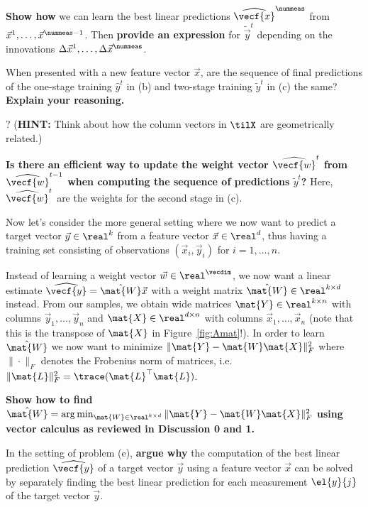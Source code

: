 \documentclass[preview]{standalone}
\begin{document}
\begin{Parts}
{\bf Show how} we can learn the best linear predictions
$\widehat{\vecf{x}}^\nummeas$ from
$\vec{x}^1,\dots, \vec{x}^{\nummeas-1}$. Then {\bf provide an
  expression} for $\tilde{\vec{y}}^t$ depending on the innovations
$\Delta\vec{x}^1,\dots, \Delta\vec{x}^{\nummeas}$.
  
  When presented with a new feature vector $\vec{x}$, are the sequence
  of final predictions of the one-stage training $\hat{y}^t$ in (b)
  and two-stage training $\tilde{y}^t$ in (c) the same?  {\bf Explain
    your reasoning.}
  





?
({\bf HINT: } Think about how the column vectors in
$\tilX$ are geometrically related.)

{\bf Is there an efficient way to update the weight vector
  $\widehat{\vecf{w}}^{t}$ from $\widehat{\vecf{w}}^{t-1}$ when
  computing the sequence of predictions $\tilde{y}^t$?} Here,
$\widehat{\vecf{w}}^{t}$ are the weights for the second stage in (c).







\Part Now let's consider the more
general setting where we now want to predict a target vector $\vec{y} \in \real^k$
from a feature vector $\vec{x} \in \real^d$, thus having a training set
consisting of observations $(\vec{x}_i, \vec{y}_i)$ for $i=1,\dots,n$.

Instead of learning a weight vector $\vec{w} \in \real^\vecdim$, we
now want a linear estimate $\widehat{\vecf{y}} = \hat{\mat{W}} \vec{x}$
with a weight matrix $\hat{\mat{W}} \in \real^{k\times d}$
instead. From our samples, we obtain wide matrices $\mat{Y} \in \real^{k\times n}$ with
columns $\vec{y}_1,\dots,\vec{y}_n$ and $\mat{X} \in \real^{d\times n}$ with columns
$\vec{x}_1, \dots,\vec{x}_n$ (note that this is the transpose of
$\mat{X}$ in Figure~\ref{fig:Amat}!). In order to learn
$\hat{\mat{W}}$ we now want to minimize
$\|\mat{Y} - \mat{W}\mat{X}\|_F^2$ where $\|\cdot\|_F$ denotes the
Frobenius norm of matrices, i.e.
$\|\mat{L}\|_F^2 = \trace(\mat{L}^\top\mat{L})$.

{\bf Show how to find
$\hat{\mat{W}} = \arg \min_{\mat{W} \in \real^{k\times d}} \|\mat{Y} - \mat{W}\mat{X}\|_F^2$
using vector calculus as reviewed in Discussion 0 and 1.}




\Part In the setting of problem (e), {\bf argue why} the computation of the best
linear prediction $\widehat{\vecf{y}}$ of a target vector $\vec{y}$ using a feature
vector $\vec{x}$ can be solved by separately finding the best linear
prediction for each measurement $\el{y}{j}$ of the target vector $\vec{y}$.



\end{Parts}
\end{document}
